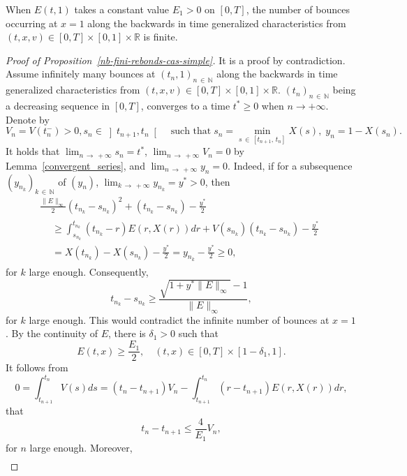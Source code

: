 \documentclass[AHL,Unicode,longabstracts,published]{cedram}
\newcommand{\R}{\mathbb{R}}
\newcommand{\N}{\mathbb{N}}
\begin{document}
\begin{prop}\label{nb-fini-rebonds-cas-simple}
When $E(t,1)$ takes a constant value $E_1>0$ on $[0,T]$, the number of bounces occurring at $x=1$ along the backwards in time generalized characteristics from $(t,x,v)\in [0,T] \times [0,1] \times \R $ is finite.
\end{prop}

\begin{proof}[{Proof of Proposition~\ref{nb-fini-rebonds-cas-simple}}]
It is a proof by contradiction. Assume infinitely many bounces at $(t_n,1)_{n\,\in\,\N}$ along the backwards in time generalized characteristics from $(t,x,v)\in [0,T]
\times [0,1] \times \R $. $(t_n)_{n\,\in\,\N}$ being a decreasing sequence in $[0,T]$, converges to a time $t^* \geq 0$ when $n \to +\infty $. Denote by
\[
V_n = V\left(t_n^-\right) > 0, s_n \in\left]t_{n+1},t_n\right[\quad \text{such that}\; s_n= \min_{s\,\in\,\left[t_{n+1},\,t_n\right]} X(s),\; y_n = 1-X\left(s_n\right).
\]
It holds that $\lim_{n\,\to\,+\infty} s_n = t^*$, $\lim_{n\,\to\,+\infty} V_n = 0$ by Lemma~\ref{convergent_series}, and $\lim_{n\,\to\,+\infty} y_n = 0$. Indeed, if for a subsequence $(y_{n_k})_{k\,\in\,\N}$ of $(y_n)$, $\lim_{k\,\to\,+\infty} y_{n_k} = y^*> 0$, then
\begin{multline*}
\frac{\| E\|_\infty }{2}(t_{n_k}-s_{n_k})^2+\left(t_{n_k}-s_{n_k}\right)-\frac{y^*}{2}\\
\begin{aligned}
&\geq \int _{s_{n_k}}^{t_{n_k}}\left(t_{n_k}-r\right)E(r,X(r))dr+V\left(s_{n_k}\right)\left(t_{n_k}-s_{n_k}\right)-\frac{y^*}{2}\\
&= X\left(t_{n_k}\right)-X\left(s_{n_k}\right)-\frac{y^*}{2}= y_{n_k}-\frac{y^*}{2}\geq 0,
\end{aligned}
\end{multline*}
for $k$ large enough. Consequently,
\[
t_{n_k}-s_{n_k}\geq \frac{\sqrt{1+y^*\|E\|_\infty }-1}{\|E\|_\infty },
\]
for $k$ large enough. This would contradict the infinite number of bounces at $x=1$. 
By the continuity of $E$, there is $\delta_1>0$ such that
\[
E(t,x) \geq \frac{E_1}{2}, \quad (t,x) \in [0,T] \times \left[1-\delta_1,1\right].
\]
It follows from
\[
0 = \int_{t_{n+1}}^{t_n} V(s)ds = \left(t_n - t_{n+1}\right) V_n - \int_{t_{n+1}}^{t_n} \left(r - t_{n+1}\right) E(r,X(r))dr,
\]
that
\begin{equation}\label{asymp_t_n-cas-simple}
t_n - t_{n+1} \leq \frac{4}{E_1}V_n,
\end{equation}
for $n$ large enough. Moreover,
\begin{align*}

\end{align*}
\end{proof}
\end{document}
